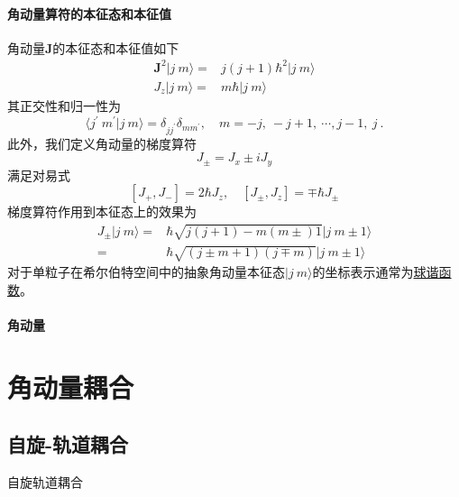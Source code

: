 \paragraph*{角动量算符的本征态和本征值} 角动量$\boldsymbol{J}$的本征态和本征值如下
\begin{align}
	\boldsymbol{J}^2 |j\ m\rangle =& j(j+1)\hbar^2 |j\ m\rangle	\\
	J_z |j\ m\rangle =& m\hbar |j\ m\rangle
\end{align}
其正交性和归一性为
\begin{equation}
	\langle j^{\prime}\ m^{\prime} | j\ m\rangle = \delta_{jj^{\prime}}\delta_{mm^{\prime}}, \quad m = -j,\ -j+1, \ \cdots, j-1,\ j \ .
\end{equation}
此外，我们定义角动量的梯度算符
\begin{equation}
	J_{\pm} = J_{x} \pm i J_{y}
\end{equation}
满足对易式
\begin{equation}
	\left[J_{+}, J_{-}\right] = 2\hbar J_z, \quad \left[J_{\pm}, J_{z}\right] = \mp \hbar J_{\pm}
\end{equation}
梯度算符作用到本征态上的效果为
\begin{equation}
	\begin{aligned}
		J_{\pm} |j\ m\rangle =& \hbar \sqrt{j(j+1) - m(m\pm)1} |j\ m\pm 1\rangle	\\
						   =& \hbar \sqrt{(j\pm m +1) (j\mp m)} |j\ m\pm 1\rangle
	\end{aligned}
\end{equation}
对于单粒子在希尔伯特空间中的抽象角动量本征态$|j\ m\rangle$的坐标表示通常为\underline{球谐函数}。

\paragraph*{角动量}

\section{角动量耦合}


\subsection{自旋-轨道耦合}
	自旋轨道耦合

